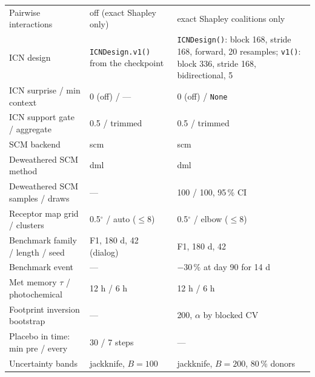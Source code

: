 \documentclass[11pt]{report}
\newcommand{\codeunderscore}{\textunderscore\allowbreak}
\newcommand{\code}[1]{\texttt{\let\_\codeunderscore #1}}
\begin{document}
\begin{center}
\begin{longtable}{@{}p{4.9cm}p{4.3cm}p{5.8cm}@{}}
Pairwise interactions          & off (exact Shapley only) & exact Shapley coalitions only \\
ICN design                     & \code{ICNDesign.v1()} from the checkpoint & \code{ICNDesign()}: block 168, stride 168, forward, 20 resamples; \code{v1()}: block 336, stride 168, bidirectional, 5 \\
ICN surprise / min context     & 0 (off) / --- & 0 (off) / \code{None} \\
ICN support gate / aggregate   & 0.5 / trimmed & 0.5 / trimmed \\
SCM backend                    & scm & scm \\
Deweathered SCM method         & dml & dml \\
Deweathered SCM samples / draws & --- & 100 / 100, 95\,\% CI \\
Receptor map grid / clusters  & 0.5$^\circ$ / auto ($\le 8$) & 0.5$^\circ$ / elbow ($\le 8$) \\
Benchmark family / length / seed & F1, 180 d, 42 (dialog) & F1, 180 d, 42 \\
Benchmark event                & --- & $-30\,\%$ at day 90 for 14 d \\
Met memory $\tau$ / photochemical & 12 h / 6 h & 12 h / 6 h \\
Footprint inversion bootstrap  & --- & 200, $\alpha$ by blocked CV \\
Placebo in time: min pre / every & 30 / 7 steps & --- \\
Uncertainty bands              & jackknife, $B = 100$ & jackknife, $B = 200$, 80\,\% donors \\
\bottomrule
\end{longtable}
\end{center}
\end{document}
